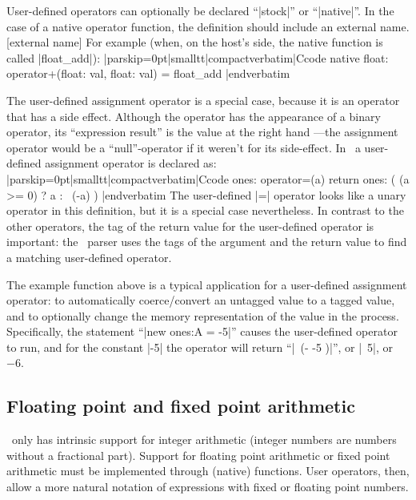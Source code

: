 \noindent{}%
User-defined operators can optionally be declared ``|stock|'' or ``|native|''.
In the case of a native operator function, the definition should include an
external name. [external name] 
For example (when, on the host's side, the native function is called |float_add|):
\listingx\verbatim|parskip=0pt|smalltt|compactverbatim|Ccode
native float: operator+(float: val, float: val) = float_add
|endverbatim\endlistingx

The user-defined assignment operator is a special case, because it is an operator
that has a side effect. Although the operator has the appearance of a binary
operator, its ``expression result'' is the value at the right hand ---the assignment
operator would be a ``null''-operator if it weren't for its side-effect. In
\Small\ a user-defined assignment operator is declared as:
\listingx\verbatim|parskip=0pt|smalltt|compactverbatim|Ccode
ones: operator=(a)
    return ones: ( (a >= 0) ? a : ~(-a) )
|endverbatim\endlistingx
The user-defined |=| operator looks like a unary operator in this definition, but
it is a special case nevertheless. In contrast to the other operators, the tag
of the return value for the user-defined operator is important: the \Small\ parser
uses the tags of the argument and the return value to find a matching user-defined
operator.

The example function above is a typical application for a user-defined assignment
operator: to automatically coerce\slash convert an untagged value to a tagged
value, and to optionally change the memory representation of the value in the
process. Specifically, the statement ``|new ones:A = -5|'' causes the user-defined
operator to run, and for the constant |-5| the operator will return ``|~(- -5 )|'',
or |~5|, or $-6$.


\subsection{Floating point and fixed point arithmetic}
 
\Small\ only has intrinsic support for integer arithmetic (integer numbers are
numbers without a fractional part). Support for floating point arithmetic or
fixed point arithmetic must be implemented through (native) functions. User
operators, then, allow a more natural notation of expressions with fixed or
floating point numbers.

